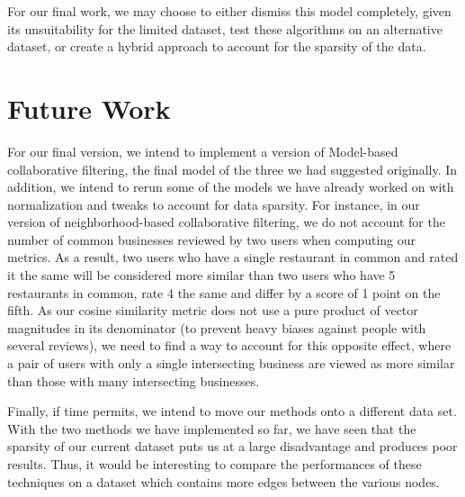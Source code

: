\documentclass[10pt, letterpaper]{article}
\begin{document}
For our final work, we may choose to either dismiss this model completely,
given its unsuitability for the limited dataset, test these algorithms on
an alternative dataset, or create a hybrid approach to account for the
sparsity of the data.

\section{Future Work}

For our final version, we intend to implement a version of Model-based
collaborative filtering, the final model of the three we had suggested
originally. In addition, we intend to rerun some of the models we have
already worked on with normalization and tweaks to account for data
sparsity. For instance, in our version of neighborhood-based collaborative
filtering, we do not account for the number of common businesses reviewed
by two users when computing our metrics. As a result, two users who have a
single restaurant in common and rated it the same will be considered more
similar than two users who have 5 restaurants in common, rate 4 the same
and differ by a score of 1 point on the fifth. As our cosine similarity
metric does not use a pure product of vector magnitudes in its denominator
(to prevent heavy biases against people with several reviews), we need to
find a way to account for this opposite effect, where a pair of users with
only a single intersecting business are viewed as more similar than those
with many intersecting businesses.

Finally, if time permits, we intend to move our methods onto a different
data set. With the two methods we have implemented so far, we have seen
that the sparsity of our current dataset puts us at a large disadvantage
and produces poor results. Thus, it would be interesting to compare the
performances of these techniques on a dataset which contains more edges
between the various nodes.
\end{document}
